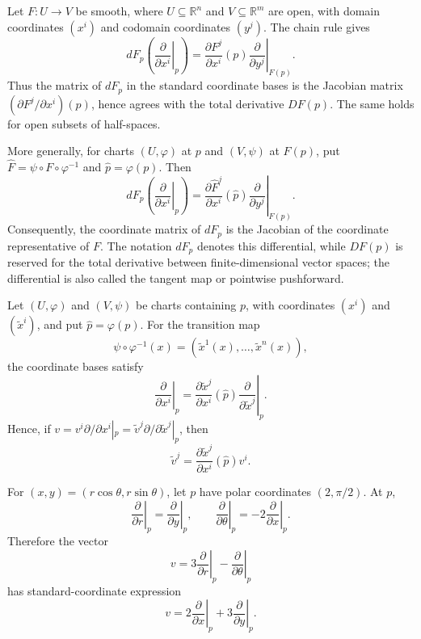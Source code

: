 \begin{remark}
\label{rem:3-15-extra-3}



Let $F:U\to V$ be smooth, where $U\subseteq\mathbb{R}^n$ and
$V\subseteq\mathbb{R}^m$ are open, with domain coordinates $(x^i)$ and
codomain coordinates $(y^j)$. The chain rule gives
\[
dF_p\left(\left.\frac{\partial}{\partial x^i}\right|_p\right)
=\left.\frac{\partial F^j}{\partial x^i}(p)
  \frac{\partial}{\partial y^j}\right|_{F(p)}. \tag{3.9}
\]
Thus the matrix of $dF_p$ in the standard coordinate bases is the Jacobian
matrix $(\partial F^j/\partial x^i)(p)$, hence agrees with the total derivative
$DF(p)$. The same holds for open subsets of half-spaces.

More generally, for charts $(U,\varphi)$ at $p$ and $(V,\psi)$ at $F(p)$,
put $\widehat F=\psi\circ F\circ\varphi^{-1}$ and
$\widehat p=\varphi(p)$. Then
\[
dF_p\left(\left.\frac{\partial}{\partial x^i}\right|_p\right)
=\left.\frac{\partial\widehat F^j}{\partial x^i}(\widehat p)
  \frac{\partial}{\partial y^j}\right|_{F(p)}. \tag{3.10}
\]
Consequently, the coordinate matrix of $dF_p$ is the Jacobian of the
coordinate representative of $F$. The notation $dF_p$ denotes this
differential, while $DF(p)$ is reserved for the total derivative between
finite-dimensional vector spaces; the differential is also called the tangent
map or pointwise pushforward.
\end{remark}

\begin{remark}
\label{rem:3-15-extra-4}



Let $(U,\varphi)$ and $(V,\psi)$ be charts containing $p$, with coordinates
$(x^i)$ and $(\widetilde x^i)$, and put $\widehat p=\varphi(p)$. For the
transition map
\[
\psi\circ\varphi^{-1}(x)
=(\widetilde x^1(x),\ldots,\widetilde x^n(x)),
\]
the coordinate bases satisfy
\[
\left.\frac{\partial}{\partial x^i}\right|_p
=\left.\frac{\partial\widetilde x^j}{\partial x^i}(\widehat p)
  \frac{\partial}{\partial\widetilde x^j}\right|_p. \tag{3.11}
\]
Hence, if
$v=v^i\partial/\partial x^i|_p
=\widetilde v^j\partial/\partial\widetilde x^j|_p$, then
\[
\widetilde v^j
=\frac{\partial\widetilde x^j}{\partial x^i}(\widehat p)v^i. \tag{3.12}
\]
\end{remark}

\begin{example}
\label{ex:3-16}




For $(x,y)=(r\cos\theta,r\sin\theta)$, let $p$ have polar coordinates
$(2,\pi/2)$. At $p$,
\[
\left.\frac{\partial}{\partial r}\right|_p
=\left.\frac{\partial}{\partial y}\right|_p,
\qquad
\left.\frac{\partial}{\partial\theta}\right|_p
=-2\left.\frac{\partial}{\partial x}\right|_p.
\]
Therefore the vector
\[
v=3\left.\frac{\partial}{\partial r}\right|_p
-\left.\frac{\partial}{\partial\theta}\right|_p
\]
has standard-coordinate expression
\[
v=2\left.\frac{\partial}{\partial x}\right|_p
+3\left.\frac{\partial}{\partial y}\right|_p.
\]
\end{example}

